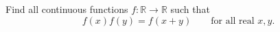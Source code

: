 Find all continuous functions $f:\mathbb R\to\mathbb R$ such that
\[
f(x)f(y)=f(x+y)\qquad\text{for all real }x,y.
\]
